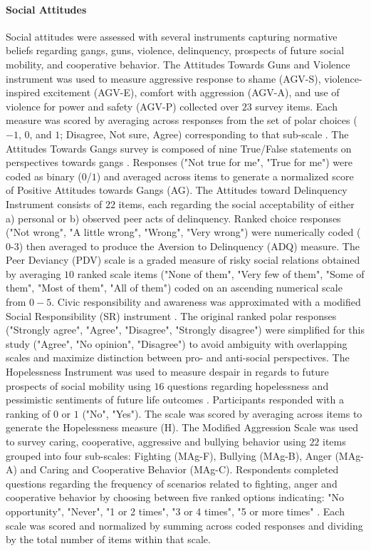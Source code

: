 \documentclass[utf8]{frontiersSCNS} %
\begin{document}
\paragraph{Social Attitudes}
Social attitudes were assessed with several instruments capturing normative beliefs regarding gangs, guns, violence, delinquency, prospects of future social mobility, and cooperative behavior. The Attitudes Towards Guns and Violence instrument was used to measure aggressive response to shame (AGV-S), violence-inspired excitement (AGV-E), comfort with aggression (AGV-A), and use of violence for power and safety (AGV-P) collected over $23$ survey items. Each measure was scored by averaging across responses from the set of polar choices ($-1$, $0$, and $1$; Disagree, Not sure, Agree) corresponding to that sub-scale \citep{shapiro1997development}. The Attitudes Towards Gangs survey is composed of nine True/False statements on perspectives towards gangs \citep{nadel1996cycle}. Responses ("Not true for me", "True for me") were coded as binary ($0$/$1$) and averaged across items to generate a normalized score of Positive Attitudes towards Gangs (AG). The Attitudes toward Delinquency Instrument consists of $22$ items, each regarding the social acceptability of either a) personal or b) observed peer acts of delinquency. Ranked choice responses ("Not wrong", "A little wrong", "Wrong", "Very wrong") were numerically coded ($0$-$3$) then averaged to produce the Aversion to Delinquency (ADQ) measure. The Peer Deviancy (PDV) scale is a graded measure of risky social relations \citep{project2004multisite} obtained by averaging $10$ ranked scale items ("None of them", "Very few of them", "Some of them", "Most of them", "All of them") coded on an ascending numerical scale from $0-5$. Civic responsibility and awareness was approximated with a modified Social Responsibility (SR) instrument \citep{nedwek1987social}. The original ranked polar responses ("Strongly agree", "Agree", "Disagree", "Strongly disagree") were simplified for this study ("Agree", "No opinion", "Disagree") to avoid ambiguity with overlapping scales and maximize distinction between pro- and anti-social perspectives. The Hopelessness Instrument was used to measure despair in regards to future prospects of social mobility using $16$ questions regarding hopelessness and pessimistic sentiments of future life outcomes \citep{kazdin1983hopelessness}. Participants responded with a ranking of $0$ or $1$ ("No", "Yes"). The scale was scored by averaging across items to generate the Hopelessness measure (H). The Modified Aggression Scale was used to survey caring, cooperative, aggressive and bullying behavior using $22$ items grouped into four sub-scales: Fighting (MAg-F), Bullying (MAg-B), Anger (MAg-A) and Caring and Cooperative Behavior (MAg-C). Respondents completed questions regarding the frequency of scenarios related to fighting, anger and cooperative behavior by choosing between five ranked options indicating: "No opportunity", "Never", "1 or 2 times", "3 or 4 times", "5 or more times" \citep{bosworth1995teen}. Each scale was scored and normalized by summing across coded responses and dividing by the total number of items within that scale. 
\end{document}
